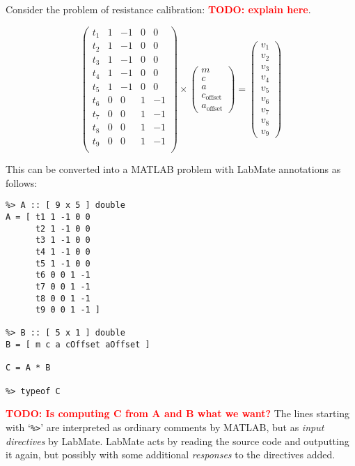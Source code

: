 \documentclass{ws-procs9x6}
\newcommand{\remph}{\emph}
\newcommand{\todo}[1]{\textcolor{red}{\textbf{TODO: #1}}}
\begin{document}

Consider the problem of resistance calibration: \todo{explain here}.


\[
\begin{pmatrix*}
  t_1 & 1 & -1 & 0 & 0 \\
  t_2 & 1 & -1 & 0 & 0 \\
  t_3 & 1 & -1 & 0 & 0 \\
  t_4 & 1 & -1 & 0 & 0 \\
  t_5 & 1 & -1 & 0 & 0 \\
  t_6 & 0 & 0 & 1 & -1 \\
  t_7 & 0 & 0 & 1 & -1 \\
  t_8 & 0 & 0 & 1 & -1 \\
  t_9 & 0 & 0 & 1 & -1 \\
\end{pmatrix*}
\times
\begin{pmatrix}
  m \\
  c \\
  a \\
  c_{\text{offset}} \\
  a_{\text{offset}}
\end{pmatrix}
=
\begin{pmatrix}
  v_1 \\
  v_2 \\
  v_3 \\
  v_4 \\
  v_5 \\
  v_6 \\
  v_7 \\
  v_8 \\
  v_9
\end{pmatrix}
\]

This can be converted into a MATLAB problem with LabMate annotations as follows:
\begin{verbatim}
%> A :: [ 9 x 5 ] double
A = [ t1 1 -1 0 0
      t2 1 -1 0 0
      t3 1 -1 0 0
      t4 1 -1 0 0
      t5 1 -1 0 0
      t6 0 0 1 -1
      t7 0 0 1 -1
      t8 0 0 1 -1
      t9 0 0 1 -1 ]

%> B :: [ 5 x 1 ] double
B = [ m c a cOffset aOffset ]

C = A * B

%> typeof C
\end{verbatim}
%
\todo{Is computing C from A and B what we want?}
The lines starting with `\texttt{\%>}' are interpreted as ordinary comments by MATLAB, but as \remph{input directives} by LabMate. LabMate acts by reading the source code and outputting it again, but possibly with some additional \remph{responses} to the directives added.
\end{document}
